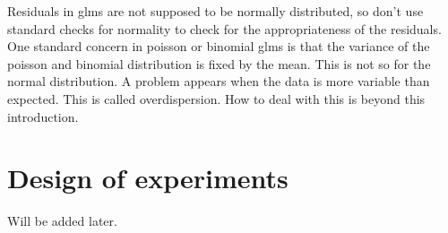 \documentclass[a4paper,twoside]{tufte-book} %
\begin{document}
Residuals in glms are not supposed to be normally distributed, so don't use standard checks for normality to check for the appropriateness of the residuals. One standard concern in poisson or binomial glms is that the variance of the poisson and binomial distribution is fixed by the mean. This is not so for the normal distribution. A problem appears when the data is more variable than expected. This is called overdispersion. How to deal with this is beyond this introduction. 


\chapter{Design of experiments}

Will be added later. 






 
\end{document}
